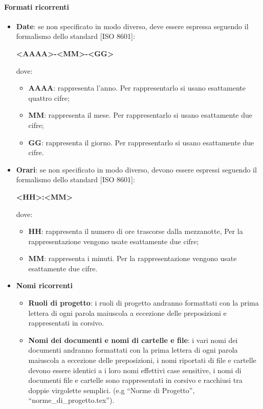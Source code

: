 			\paragraph{Formati ricorrenti}
				\begin{itemize}
					\item\textbf{Date}: se non specificato in modo diverso, deve essere espressa seguendo il formalismo dello standard [ISO 8601]:\\
						\begin{center}
							\textbf{<AAAA>-<MM>-<GG>}
						\end{center}
						dove:\\
						\begin{itemize}
							\item\textbf{AAAA}: rappresenta l’anno. Per rappresentarlo si usano esattamente quattro cifre;
							\item\textbf{MM}: rappresenta il mese. Per rappresentarlo si usano esattamente due cifre;
							\item\textbf{GG}: rappresenta il giorno. Per rappresentarlo si usano esattamente due cifre.
						\end{itemize}
					\item\textbf{Orari}:  se non specificato in modo diverso, devono essere espressi seguendo il formalismo dello standard [ISO 8601]:\\
						\begin{center}
							\textbf{<HH>:<MM>}
						\end{center}
						dove:\\
						\begin{itemize}
							\item\textbf{HH}: rappresenta il numero di ore trascorse dalla mezzanotte, Per la rappresentazione vengono usate esattamente due cifre;
							\item\textbf{MM}: rappresenta i minuti. Per la rappresentazione vengono usate esattamente due cifre.
						\end{itemize}
					\item\textbf{Nomi ricorrenti}\\
						\begin{itemize}
							\item\textbf{Ruoli di progetto}: i ruoli di progetto andranno formattati con la prima lettera di ogni parola maiuscola a eccezione delle preposizioni e rappresentati in corsivo.
							\item\textbf{Nomi dei documenti e nomi di cartelle e file}: i vari nomi dei documenti andranno formattati con la prima lettera di ogni parola maiuscola a eccezione delle preposizioni, i nomi riportati di file e cartelle devono essere identici a i loro nomi effettivi case sensitive, i nomi di documenti file e cartelle sono rappresentati in corsivo e racchiusi tra doppie virgolette semplici. (e.g “Norme di Progetto”, “norme\_di\_progetto.tex”).

\end{itemize}
\end{itemize}
